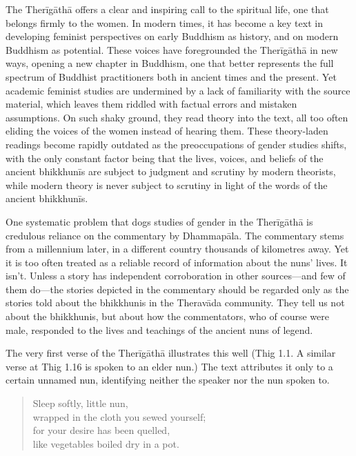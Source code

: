 \documentclass[12pt,openany]{book}%
\begin{document}
The \textsanskrit{Therīgāthā} offers a clear and inspiring call to the spiritual life, one that belongs firmly to the women. In modern times, it has become a key text in developing feminist perspectives on early Buddhism as history, and on modern Buddhism as potential. These voices have foregrounded the \textsanskrit{Therīgāthā} in new ways, opening a new chapter in Buddhism, one that better represents the full spectrum of Buddhist practitioners both in ancient times and the present. Yet academic feminist studies are undermined by a lack of familiarity with the source material, which leaves them riddled with factual errors and mistaken assumptions. On such shaky ground, they read theory into the text, all too often eliding the voices of the women instead of hearing them. These theory-laden readings become rapidly outdated as the preoccupations of gender studies shifts, with the only constant factor being that the lives, voices, and beliefs of the ancient \textsanskrit{bhikkhunīs} are subject to judgment and scrutiny by modern theorists, while modern theory is never subject to scrutiny in light of the words of the ancient \textsanskrit{bhikkhunīs}.

One systematic problem that dogs studies of gender in the \textsanskrit{Therīgāthā} is credulous reliance on the commentary by \textsanskrit{Dhammapāla}. The commentary stems from a millennium later, in a different country thousands of kilometres away. Yet it is too often treated as a reliable record of information about the nuns’ lives. It isn’t. Unless a story has independent corroboration in other sources—and few of them do—the stories depicted in the commentary should be regarded only as the stories told about the bhikkhunis in the \textsanskrit{Theravāda} community. They tell us not about the bhikkhunis, but about how the commentators, who of course were male, responded to the lives and teachings of the ancient nuns of legend.

The very first verse of the \textsanskrit{Therīgāthā} illustrates this well (Thig 1.1. A similar verse at Thig 1.16 is spoken to an elder nun.) The text attributes it only to a certain unnamed nun, identifying neither the speaker nor the nun spoken to.

\begin{quotation}%
Sleep softly, little nun,\\

wrapped in the cloth you sewed yourself;\\

for your desire has been quelled,\\

like vegetables boiled dry in a pot.

%
\end{quotation}
\end{document}
